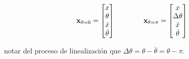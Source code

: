 \documentclass[11pt, a4paper, twoside, openright, openany]{book}
\begin{document}
\[
\mathbf{x}_{\theta=0} = \begin{bmatrix}
x \\ \theta \\ \dot{x} \\ \dot{\theta}
\end{bmatrix} \qquad \qquad 
\mathbf{x}_{\theta=\pi} = \begin{bmatrix}
x \\ \Delta \theta \\ \dot{x} \\ \dot{\theta}
\end{bmatrix}
\]

notar del proceso de linealización que $\Delta \theta = \theta - \bar{\theta} = \theta - \pi$.





\end{document}
